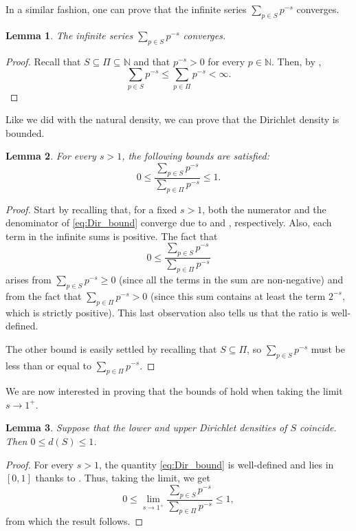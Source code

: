 \documentclass[a4paper,11pt]{article}
\theoremstyle{plain}
\newtheorem{lemma}[lemma]{Lemma}
\newcommand{\N}{\ensuremath{\mathbb{N}}} %
\begin{document}
    In a similar fashion, one can prove that the infinite series $\sum_{p\in S}p^{-s}$ converges.
    \begin{lemma}
    \label{lemma:Dir2}
       The infinite series $\sum_{p\in S}p^{-s}$ converges.
    \end{lemma}
    \begin{proof}
       Recall that $S\subseteq\Pi\subseteq\N$ and that $p^{-s}>0$ for every $p\in\N$. Then, by ,
       \begin{equation*}
           \sum_{p\in S}p^{-s}\leq\sum_{p\in\Pi}p^{-s}<\infty.
       \end{equation*}
    \end{proof}

    Like we did with the natural density, we can prove that the Dirichlet density is bounded.
    \begin{lemma}
    \label{lemma:Dir3}
        For every $s>1$, the following bounds are satisfied:
        \begin{equation}
        \label{eq:Dir_bound}
           0\leq\frac{\sum_{p\in S}p^{-s}}{\sum_{p\in \Pi}p^{-s}}\leq 1.
        \end{equation}  
    \end{lemma}
    \begin{proof}
        Start by recalling that, for a fixed $s>1$, both the numerator and the denominator of \eqref{eq:Dir_bound} converge due to  and , respectively. Also, each term in the infinite sums is positive. The fact that
         \begin{equation*}
            0\leq\frac{\sum_{p\in S}p^{-s}}{\sum_{p\in \Pi}p^{-s}}
        \end{equation*} 
        arises from $\sum_{p\in S}p^{-s}\geq 0$ (since all the terms in the sum are non-negative) and from the fact that $\sum_{p\in \Pi}p^{-s}>0$ (since this sum contains at least the term $2^{-s}$, which is strictly positive). This last observation also tells us that the ratio is well-defined.

        The other bound is easily settled by recalling that $S\subseteq\Pi$, so $\sum_{p\in S}p^{-s}$ must be less than or equal to $\sum_{p\in \Pi}p^{-s}$.
    \end{proof}

    We are now interested in proving that the bounds of  hold when taking the limit $s\rightarrow 1^+$.

    \begin{lemma}
    \label{lemma:Dir4}
        Suppose that the lower and upper Dirichlet densities of $S$ coincide. Then $0\leq d(S)\leq 1$.
    \end{lemma}
    \begin{proof}
        For every $s>1$, the quantity \eqref{eq:Dir_bound} is well-defined and lies in $[0,1]$ thanks to . Thus, taking the limit, we get 
        \begin{equation*}
            0\leq \lim_{s\rightarrow1^+}\frac{\sum_{p\in S}p^{-s}}{\sum_{p\in \Pi}p^{-s}}\leq 1,
        \end{equation*}
        from which the result follows.
    \end{proof}
\end{document}

